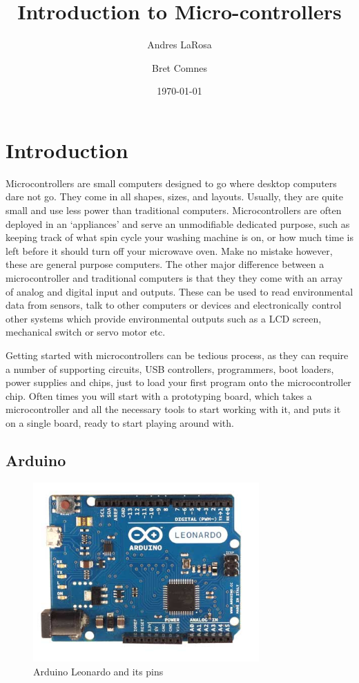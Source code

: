 \documentclass[11pt,a4paper]{article}
\begin{document}
\title{Introduction to Micro-controllers}
\date{\today} 
\author{Andres LaRosa}
\author{Bret Comnes}
\maketitle

\section{Introduction} %
\label{sec:introduction}

Microcontrollers are small computers designed to go where desktop computers dare not go.  They come in all shapes, sizes, and layouts.  Usually, they are quite small and use less power than traditional computers.  Microcontrollers are often deployed in an `appliances' and serve an unmodifiable dedicated purpose, such as keeping track of what spin cycle your washing machine is on, or how much time is left before it should turn off your microwave oven.  Make no mistake however, these are general purpose computers.  The other major difference between a microcontroller and traditional computers is that they they come with an array of analog and digital input and outputs. These can be used to read environmental data from sensors, talk to other computers or devices and electronically control other systems which provide environmental outputs such as a LCD screen, mechanical switch or servo motor etc.  \cite{wpmicro}

Getting started with microcontrollers can be tedious process, as they can require a number of supporting circuits, USB controllers, programmers, boot loaders, power supplies and chips, just to load your first program onto the microcontroller chip.  Often times you will start with a prototyping board, which takes a microcontroller and all the necessary tools to start working with it, and puts it on a single board, ready to start playing around with.

\subsection{Arduino} %
\label{sub:arduino}

\begin{figure}[htbp]
	\centering
		\includegraphics[height=2.7in]{figures/ArduinoLeonardoFront_2_450px.jpg}
	\caption{Arduino Leonardo and its pins\cite{leonardo}}
	\label{fig:figures_ArduinoLeonardoFront_2_450px}
\end{figure}
\end{document}
